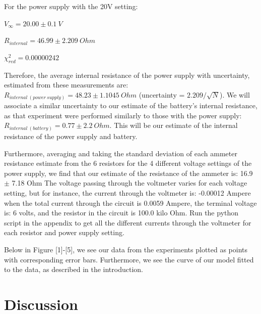 \documentclass[letterpaper,12pt]{article}
\begin{document}
For the power supply with the 20V setting:

$V_{\infty} = 20.00 \pm 0.1\ V$

$R_{internal} = 46.99 \pm 2.209\ Ohm$

$\chi_{red}^2 = 0.00000242$

Therefore, the average internal resistance of the power supply with uncertainty, 
estimated from these measurements are:
$R_{internal\ (power\ supply)} = 48.23 \pm 1.1045\ Ohm$ (uncertainty = $2.209/\sqrt{N}$).
We will associate a similar uncertainty to our estimate of the battery’s internal resistance, as that experiment were performed similarly to those with the power supply:
$R_{internal\ (battery)} = 0.77 \pm 2.2\ Ohm$.
This will be our estimate of the internal resistance of the power supply and battery.

Furthermore, averaging and taking the standard deviation of each ammeter resistance
 estimate from the 6 resistors for the 4 different voltage settings of the power 
 supply, we find that our estimate of the resistance of the ammeter is: 16.9 $\pm$ 7.18 Ohm
The voltage passing through the voltmeter varies for each voltage setting, but for 
instance, the current through the voltmeter is: -0.00012 Ampere when the total current through the 
circuit is 0.0059 Ampere, the terminal voltage is: 6 volts, and the resistor in the circuit is 100.0 kilo Ohm.
Run the python script in the appendix to get all the different currents through the voltmeter for each resistor and power supply setting.

Below in Figure [1]-[5], we see our data from the experiments plotted as points with corresponding error bars. Furthermore, we see the curve of our model fitted to the data, as described in the introduction. 

\section{Discussion}
\end{document}
